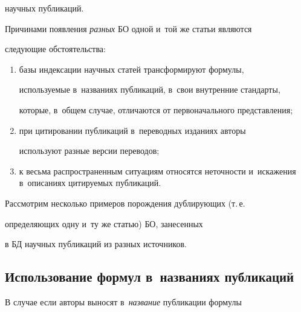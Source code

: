 научных публикаций.





  Причинами появления \textit{разных} БО одной и~той же статьи являются


следующие обстоятельства:


  \begin{enumerate}[(1)]


\item базы индексации научных статей трансформируют формулы,


используемые в~названиях публикаций, в~свои внутренние стандарты,


которые, в~общем случае, отличаются от первоначального представления;\\[-14pt]


\item при цитировании публикаций в~переводных изданиях авторы


используют разные версии переводов;\\[-14pt]


\item к весьма распространенным ситуациям относятся неточности и~искажения в~описаниях цитируемых публикаций.


\end{enumerate}





  Рассмотрим несколько примеров порождения дублирующих (т.\,е.\


опреде\-ля\-ющих одну и~ту же статью) БО, занесенных


в БД научных публикаций из разных источников.





\vspace*{-4pt}





\subsection{Использование формул в~названиях публикаций}





\vspace*{-2pt}





  В случае если авторы выносят в~\textit{название} публикации формулы


